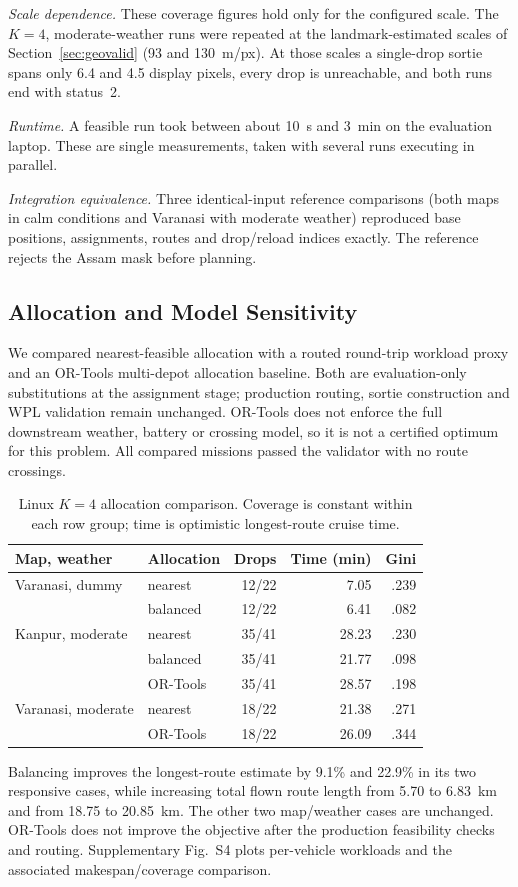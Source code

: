 \emph{Scale dependence.} These coverage figures hold only for the configured scale. The $K=4$, moderate-weather runs were repeated at the landmark-estimated scales of Section~\ref{sec:geovalid} (93 and 130~m/px). At those scales a single-drop sortie spans only 6.4 and 4.5 display pixels, every drop is unreachable, and both runs end with status~2.

\emph{Runtime.} A feasible run took between about 10~s and 3~min on the evaluation laptop. These are single measurements, taken with several runs executing in parallel.

\emph{Integration equivalence.} Three identical-input reference comparisons (both maps in calm conditions and Varanasi with moderate weather) reproduced base positions, assignments, routes and drop/reload indices exactly. The reference rejects the Assam mask before planning.

\subsection{Allocation and Model Sensitivity}
\label{sec:allocres}
We compared nearest-feasible allocation with a routed round-trip workload proxy and an OR-Tools multi-depot allocation baseline. Both are evaluation-only substitutions at the assignment stage; production routing, sortie construction and WPL validation remain unchanged. OR-Tools does not enforce the full downstream weather, battery or crossing model, so it is not a certified optimum for this problem. All compared missions passed the validator with no route crossings.

\begin{table}[t]
\centering
\caption{Linux $K=4$ allocation comparison. Coverage is constant within each row group; time is optimistic longest-route cruise time.}
\label{tab:allocation}
\footnotesize
\setlength{\tabcolsep}{3pt}
\begin{tabular}{@{}llrrr@{}}\toprule
Map, weather & Allocation & Drops & Time (min) & Gini\\\midrule
Varanasi, dummy & nearest & 12/22 & 7.05 & .239\\
 & balanced & 12/22 & 6.41 & .082\\
Kanpur, moderate & nearest & 35/41 & 28.23 & .230\\
 & balanced & 35/41 & 21.77 & .098\\
 & OR-Tools & 35/41 & 28.57 & .198\\
Varanasi, moderate & nearest & 18/22 & 21.38 & .271\\
 & OR-Tools & 18/22 & 26.09 & .344\\\bottomrule
\end{tabular}
\end{table}
Balancing improves the longest-route estimate by 9.1\% and 22.9\% in its two responsive cases, while increasing total flown route length from 5.70 to 6.83~km and from 18.75 to 20.85~km. The other two map/weather cases are unchanged. OR-Tools does not improve the objective after the production feasibility checks and routing.
Supplementary Fig.~S4 plots per-vehicle workloads and the associated makespan/coverage comparison.

